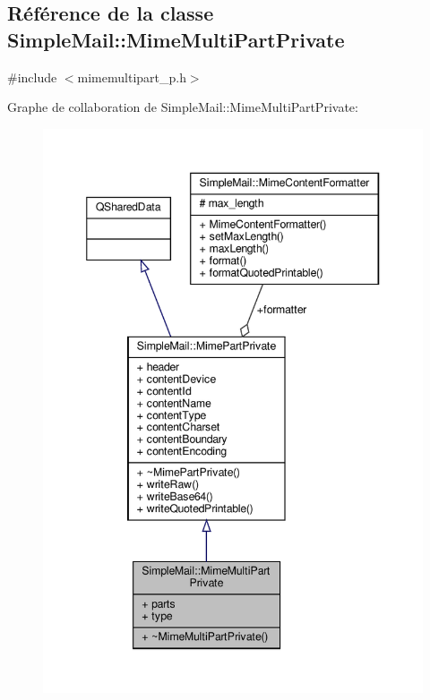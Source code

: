 \hypertarget{class_simple_mail_1_1_mime_multi_part_private}{}\subsection{Référence de la classe Simple\+Mail\+:\+:Mime\+Multi\+Part\+Private}
\label{class_simple_mail_1_1_mime_multi_part_private}


{\ttfamily \#include $<$mimemultipart\+\_\+p.\+h$>$}



Graphe de collaboration de Simple\+Mail\+:\+:Mime\+Multi\+Part\+Private\+:\nopagebreak
\begin{figure}[H]
\begin{center}
\leavevmode
\includegraphics[width=346pt]{class_simple_mail_1_1_mime_multi_part_private__coll__graph}
\end{center}
\end{figure}

